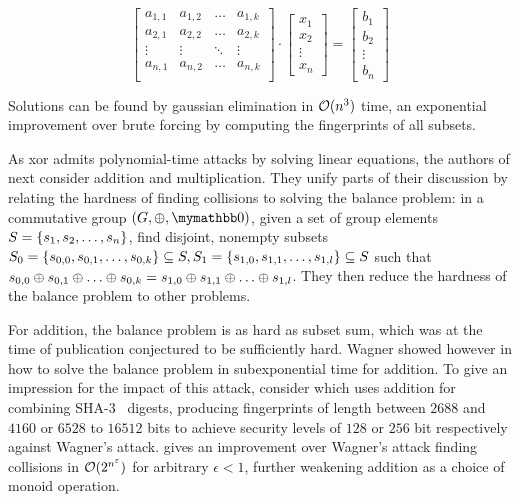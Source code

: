 \[
\begin{bmatrix}
a_{1, 1} & a_{1, 2} & \ldots & a_{1, k}\\
a_{2, 1} & a_{2, 2} & \ldots & a_{2, k}\\
\vdots & \vdots & \ddots & \vdots \\
a_{n, 1} & a_{n, 2} & \ldots & a_{n, k}\\
\end{bmatrix} \cdot \begin{bmatrix}
x_1\\
x_2\\
\vdots\\
x_n
\end{bmatrix} = \begin{bmatrix}
b_1\\
b_2\\
\vdots\\
b_n
\end{bmatrix}
\]

Solutions can be found by gaussian elimination in $\mathcal{O}(n^3)$ time, an exponential improvement over brute forcing by computing the fingerprints of all subsets.

As xor admits polynomial-time attacks by solving linear equations, the authors of \cite{bellare1997new} next consider addition and multiplication. They unify parts of their discussion by relating the hardness of finding collisions to solving the balance problem: in a commutative group $(G, \groupaddsym, \neutraladd)$, given a set of group elements $S = \{s_1, s_2, \ldots, s_n\}$, find disjoint, nonempty subsets $S_0 = \{s_{0, 0}, s_{0, 1}, \ldots, s_{0, k}\} \subseteq S, S_1 = \{s_{1, 0}, s_{1, 1}, \ldots, s_{1, l}\} \subseteq S$ such that $s_{0, 0} \oplus s_{0, 1}  \oplus \ldots  \oplus s_{0, k} = s_{1, 0}  \oplus s_{1, 1}  \oplus \ldots  \oplus s_{1, l}$. They then reduce the hardness of the balance problem to other problems.

For addition, the balance problem is as hard as subset sum, which was at the time of publication conjectured to be sufficiently hard. Wagner showed however in \cite{wagner2002generalized} how to solve the balance problem in subexponential time for addition. To give an impression for the impact of this attack, consider \cite{mihajloska2015reviving} which uses addition for combining SHA-3~\cite{dworkin2015sha} digests, producing fingerprints of length between $2688$ and $4160$ or $6528$ to $16512$ bits to achieve security levels of $128$ or $256$ bit respectively against Wagner's attack. \cite{lyubashevsky2005parity} gives an improvement over Wagner's attack finding collisions in $\mathcal{O}(2^{n^\varepsilon})$ for arbitrary $\epsilon < 1$, further weakening addition as a choice of monoid operation.


